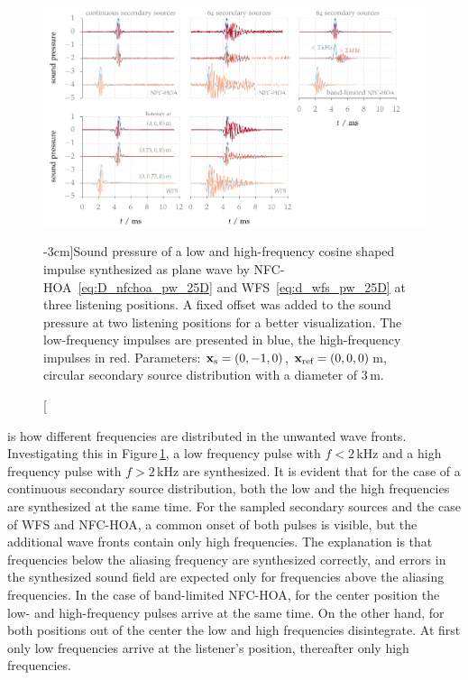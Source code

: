 \begin{figure}[tb]
    \vspace{-0.5cm}
    \includegraphics{fig3_15/fig3_15}
    \caption[][-3cm]{Sound pressure of a low and high-frequency cosine shaped
    impulse synthesized as plane wave by
    \ac{NFC-HOA}~\protect\eqref{eq:D_nfchoa_pw_25D} and
    \ac{WFS}~\protect\eqref{eq:d_wfs_pw_25D} at three listening positions. A
    fixed offset was added to the sound pressure at two listening positions for
    a better visualization. The low-frequency impulses are presented in blue, the
    high-frequency impulses in red.
    Parameters: $\mathbf{x}_\text{s} = (0,-1,0)$, $\mathbf{x}_\text{ref} = (0,0,0)$\,m, circular secondary
    source distribution with a diameter of $3$\,m.
    }
    \label{fig:sound_field_imp_fixed_filtered}
\end{figure}
%
 is how different frequencies
are distributed in the unwanted wave fronts. Investigating this in
Figure\,\ref{fig:sound_field_imp_fixed_filtered}, a low frequency pulse with $f <
2$\,kHz and a high frequency pulse with $f > 2$\,kHz are synthesized. It is
evident that for the case of a continuous secondary source distribution,
both the low and the high frequencies are synthesized at the same time. For
the sampled secondary sources and the case of \ac{WFS} and \ac{NFC-HOA}, a common onset of
both pulses is visible, but the additional wave fronts contain only high
frequencies. The explanation is that frequencies below the
aliasing frequency are synthesized correctly, and errors in the synthesized
sound field are expected only for frequencies
above the aliasing frequencies.
In the case of band-limited \ac{NFC-HOA}, for the center position the low- and
high-frequency pulses arrive at the same time. On the other hand,
for both positions out of the
center the low and high frequencies disintegrate. At first only low
frequencies arrive at the listener's position, thereafter only high
frequencies.

